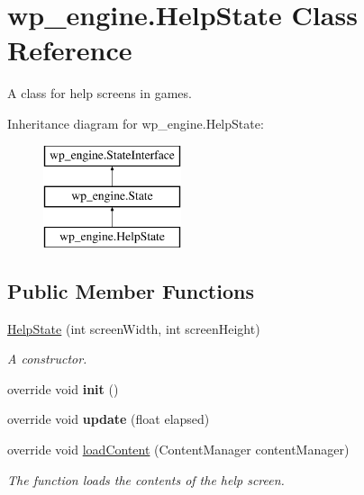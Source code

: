 \hypertarget{classwp__engine_1_1_help_state}{\section{wp\-\_\-engine.\-Help\-State Class Reference}
\label{classwp__engine_1_1_help_state}
}


A class for help screens in games.  


Inheritance diagram for wp\-\_\-engine.\-Help\-State\-:\begin{figure}[H]
\begin{center}
\leavevmode
\includegraphics[height=3.000000cm]{classwp__engine_1_1_help_state}
\end{center}
\end{figure}
\subsection*{Public Member Functions}
\begin{DoxyCompactItemize}
\item 
\hyperlink{classwp__engine_1_1_help_state_a1916515cd4099c29f48f64474b6e5850}{Help\-State} (int screen\-Width, int screen\-Height)
\begin{DoxyCompactList}\small\item\em A constructor. \end{DoxyCompactList}\item 
\hypertarget{classwp__engine_1_1_help_state_ad929e3ae0212920f812240b50ed9379e}{override void {\bfseries init} ()}\label{classwp__engine_1_1_help_state_ad929e3ae0212920f812240b50ed9379e}

\item 
\hypertarget{classwp__engine_1_1_help_state_a7b235d6639cc38ef381fb693a72ec418}{override void {\bfseries update} (float elapsed)}\label{classwp__engine_1_1_help_state_a7b235d6639cc38ef381fb693a72ec418}

\item 
override void \hyperlink{classwp__engine_1_1_help_state_a2c671a3ef7985614c016bfb2881e3da2}{load\-Content} (Content\-Manager content\-Manager)
\begin{DoxyCompactList}\small\item\em The function loads the contents of the help screen. \end{DoxyCompactList}\end{DoxyCompactItemize}
